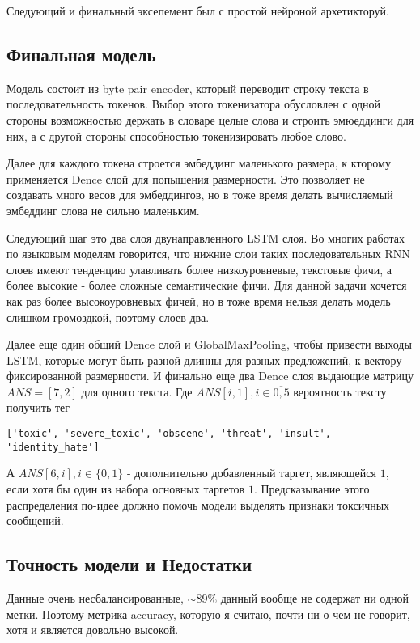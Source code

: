 \documentclass[13pt,a4paper]{article}
\theoremstyle{remark}
\begin{document}
	
	Следующий и финальный эксепемент был с простой нейроной архетикторуй.
	
	\subsection*{Финальная модель}
	
	Модель состоит из byte pair encoder, который переводит строку текста в последовательность токенов. Выбор этого токенизатора обусловлен с одной стороны возможностью держать в словаре целые слова и строить эмюеддинги для них, а с другой стороны способностью токенизировать любое слово.
	
	Далее для каждого токена строется эмбеддинг маленького размера, к кторому применяется Dence слой для попышения размерности. Это позволяет не создавать много весов для эмбеддингов, но в тоже время делать вычисляемый эмбеддинг слова не сильно маленьким.
	
	Следующий шаг это два слоя двунаправленного LSTM слоя. Во многих работах по языковым моделям говорится, что нижние слои таких последовательных RNN слоев имеют тенденцию улавливать более низкоуровневые, текстовые фичи, а более высокие - более сложные семантические фичи. Для данной задачи хочется как раз более высокоуровневых фичей, но в тоже время нельзя делать модель слишком громоздкой, поэтому слоев два.
	
	Далее еще один общий Dence слой и GlobalMaxPooling, чтобы привести выходы LSTM, которые могут быть разной длинны для разных предложений, к вектору фиксированной размерности. И финально еще два Dence слоя выдающие матрицу $ANS = [7, 2]$ для одного текста. Где $ANS[i, 1], i \in \overline{0, 5}$ вероятность тексту получить тег 
	
	\verb|['toxic', 'severe_toxic', 'obscene', 'threat', 'insult', 'identity_hate']|
	
	А $ANS[6, i], i\in \{0, 1\}$ - дополнительно добавленный таргет, являющейся $1$, если хотя бы один из набора основных таргетов $1$. Предсказывание этого распределения по-идее должно помочь модели выделять признаки токсичных сообщений.


	\subsection*{Точность модели и Недостатки}
	
	Данные очень несбалансированные, $\sim 89 \%$ данный вообще не содержат ни одной метки. Поэтому метрика  accuracy, которую я считаю, почти ни о чем не говорит, хотя и является довольно высокой.
	
\end{document}

